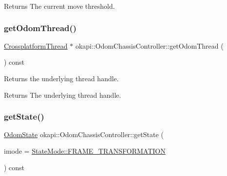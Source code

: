 \begin{DoxyReturn}{Returns}
The current move threshold. 
\end{DoxyReturn}
\mbox{\label{classokapi_1_1OdomChassisController_a6ab78730e502dc551894e7efdb9f4edf}} 
\subsubsection{\texorpdfstring{getOdomThread()}{getOdomThread()}}
{\footnotesize\ttfamily \mbox{\hyperlink{classCrossplatformThread}{Crossplatform\+Thread}} $\ast$ okapi\+::\+Odom\+Chassis\+Controller\+::get\+Odom\+Thread (\begin{DoxyParamCaption}{ }\end{DoxyParamCaption}) const}

Returns the underlying thread handle.

\begin{DoxyReturn}{Returns}
The underlying thread handle. 
\end{DoxyReturn}
\mbox{\label{classokapi_1_1OdomChassisController_aa7b4675edd3cdd920e287fc5e824892f}} 
\subsubsection{\texorpdfstring{getState()}{getState()}}
{\footnotesize\ttfamily \mbox{\hyperlink{structokapi_1_1OdomState}{Odom\+State}} okapi\+::\+Odom\+Chassis\+Controller\+::get\+State (\begin{DoxyParamCaption}\item[{const \mbox{\hyperlink{namespaceokapi_af37fbd761bd859a00ff4dd4a87dd8c07}{State\+Mode}} \&}]{imode = {\ttfamily \mbox{\hyperlink{namespaceokapi_af37fbd761bd859a00ff4dd4a87dd8c07ad5ed7666e5cebf60d3af20a5a46edf3b}{State\+Mode\+::\+F\+R\+A\+M\+E\+\_\+\+T\+R\+A\+N\+S\+F\+O\+R\+M\+A\+T\+I\+ON}}} }\end{DoxyParamCaption}) const\hspace{0.3cm}{\ttfamily [virtual]}}

